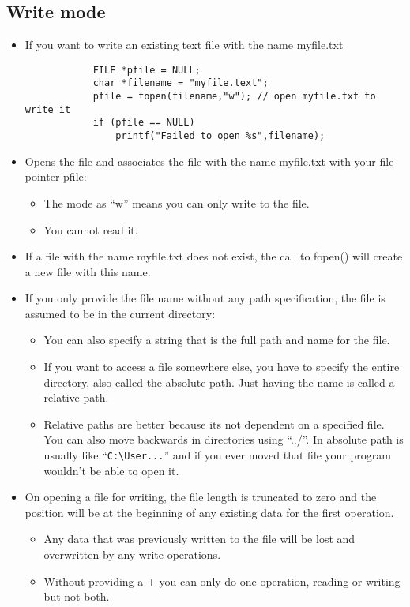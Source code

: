 \subsection{Write mode}
\begin{itemize}
    \item If you want to write an existing text file with the name myfile.txt
        \begin{verbatim}
            FILE *pfile = NULL;
            char *filename = "myfile.text";
            pfile = fopen(filename,"w"); // open myfile.txt to write it
            if (pfile == NULL)
                printf("Failed to open %s",filename);
        \end{verbatim}
    
    \item Opens the file and associates the file with the name myfile.txt with your file pointer pfile:
        \begin{itemize}
            \item The mode as ``w'' means you can only write to the file.
            \item You cannot read it.
        \end{itemize}
    
    \item If a file with the name myfile.txt does not exist, the call to fopen() will create a new file with this name.
    \item If you only provide the file name without any path specification, the file is assumed to be in the current directory:
        \begin{itemize}
            \item You can also specify a string that is the full path and name for the file.
            \item If you want to access a file somewhere else, you have to specify the entire directory, also called the absolute path. Just having the name is called a relative path. 
            \item Relative paths are better because its not dependent on a specified file. You can also move backwards in directories using ``../''. In absolute path is usually like ``\verb|C:\User...|'' and if you ever moved that file your program wouldn't be able to open it.
        \end{itemize}
    
    \item On opening a file for writing, the file length is truncated to zero and the position will be at the beginning of any existing data for the first operation.
        \begin{itemize}
            \item Any data that was previously written to the file will be lost and overwritten by any write operations.
            \item Without providing a + you can only do one operation, reading or writing but not both.
        \end{itemize}
\end{itemize}

